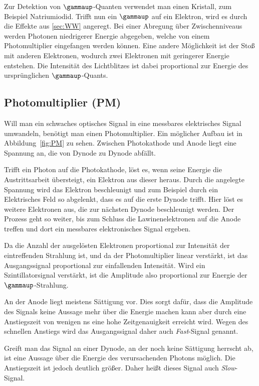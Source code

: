 Zur Detektion von $\gammaup$-Quanten verwendet man einen Kristall, zum Beispiel
Natriumiodid. Trifft nun ein $\gammaup$ auf ein Elektron, wird es durch die
Effekte aus \ref{sec:WW} angeregt. Bei einer Abregung über Zwischenniveaus
werden Photonen niedrigerer Energie abgegeben, welche von einem
Photomultiplier eingefangen werden können. Eine andere Möglichkeit ist der
Stoß mit anderen Elektronen, wodurch zwei Elektronen mit geringerer Energie
entstehen. Die Intensität des Lichtblitzes ist dabei proportional zur Energie
des ursprünglichen $\gammaup$-Quants.

\subsection{Photomultiplier (PM)}

Will man ein schwaches optisches Signal in eine messbares elektrisches Signal
umwandeln, benötigt man einen Photomultiplier. Ein möglicher Aufbau ist in
Abbildung~\ref{fig:PM} zu sehen. Zwischen Photokathode und Anode liegt eine
Spannung an, die von Dynode zu Dynode abfällt.

Trifft ein Photon auf die Photokathode, löst es, wenn seine Energie die
Austrittsarbeit übersteigt, ein Elektron aus dieser heraus. Durch die angelegte
Spannung wird das Elektron beschleunigt und zum Beispiel durch ein Elektrisches
Feld so abgelenkt, dass es auf die erste Dynode trifft. Hier löst es weitere
Elektronen aus, die zur nächsten Dynode beschleunigt werden. Der Prozess geht
so weiter, bis zum Schluss die Lawinenelektronen auf die Anode treffen und dort
ein messbares elektronisches Signal ergeben.

Da die Anzahl der ausgelösten Elektronen proportional zur Intensität der
eintreffenden Strahlung ist, und da der Photomultiplier linear verstärkt, ist
das Ausgangssignal proportional zur einfallenden Intensität. Wird ein
Szintillatorsignal verstärkt, ist die Amplitude also proportional zur Energie
der $\gammaup$-Strahlung.

An der Anode liegt meistens Sättigung vor. Dies sorgt dafür, dass die Amplitude
des Signals keine Aussage mehr über die Energie machen kann aber durch eine
Anstiegszeit von wenigen \si{\nano\second} eine hohe Zeitgenauigkeit erreicht
wird. Wegen des schnellen Anstiegs wird das Ausgangssignal daher auch
\emph{Fast}-Signal genannt.

Greift man das Signal an einer Dynode, an der noch keine Sättigung herrscht ab,
ist eine Aussage über die Energie des verursachenden Photons möglich. Die
Anstiegszeit ist jedoch deutlich größer. Daher heißt dieses Signal auch
\emph{Slow}-Signal.


